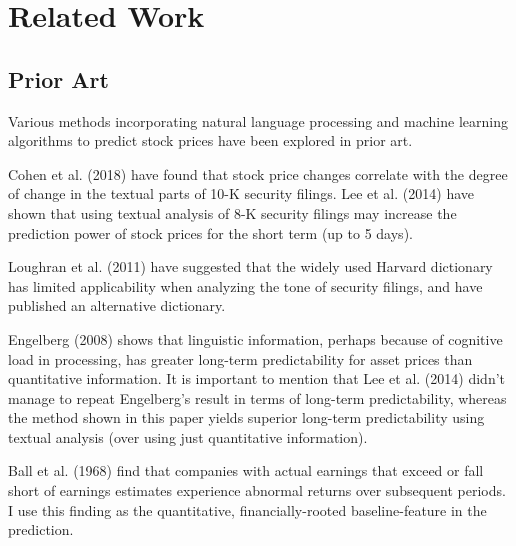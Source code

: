\documentclass[11pt,a4paper]{article}
\begin{document}
\section{Related Work}
\subsection{Prior Art}

Various methods incorporating natural language processing and machine learning algorithms to predict stock prices have been explored in prior art.

Cohen et al. (2018) \cite{cohen2018lazy} have found that stock price changes correlate with the degree of change in the textual parts of 10-K security filings. Lee et al. (2014) \cite{lee2014importance} have shown that using textual analysis of 8-K security filings may increase the prediction power of stock prices for the short term (up to 5 days). 

Loughran et al. (2011) \cite{loughran2011liability} have suggested that the widely used Harvard dictionary has limited applicability when analyzing the tone of security filings, and have published an alternative dictionary.

Engelberg (2008) \cite{engelberg2008costly} shows that linguistic information, perhaps because of cognitive load in processing, has greater long-term predictability for asset prices than quantitative information. It is important to mention that Lee et al. (2014) didn't manage to repeat Engelberg's result in terms of long-term predictability, whereas the method shown in this paper yields superior long-term predictability using textual analysis (over using just quantitative information).

Ball et al. (1968) \cite{ball1968empirical} find that companies with actual earnings that exceed or fall short of earnings estimates experience abnormal returns over subsequent periods. I use this finding as the quantitative, financially-rooted baseline-feature in the prediction.
\end{document}
